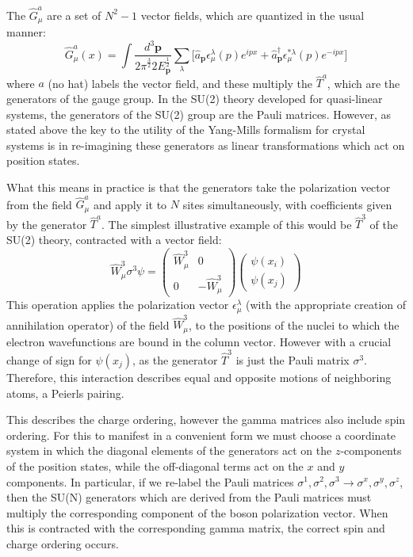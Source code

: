 \documentclass[prb,showpacs,superscriptaddress,titlepage,amsmath,amssymb,twocolumn]{revtex4-1}
\begin{document}
The $\hat{G}^{a}_{\mu}$ are a set of $N^{2}-1$ vector fields, which are quantized in the usual manner:
\begin{equation}
\hat{G}^{a}_{\mu}(x) = \int \frac{d^{3}\mathbf{p}}{{2\pi}^\frac{3}{2}2E_{\mathbf{p}}^{\frac{1}{2}}}\sum_{\lambda}\big[\hat{a}_{\mathbf{p}}\epsilon^{\lambda}_{\mu}(p)e^{ipx} + \hat{a}_{\mathbf{p}}^{\dagger}\epsilon^{*\lambda}_{\mu}(p)e^{-ipx}\big]
\label{A-field}
\end{equation}
where $a$ (no hat) labels the vector field, and these multiply the $\hat{T}^{a}$, which are the generators of the gauge group. In the SU(2) theory developed for quasi-linear systems, the generators of the SU(2) group are the Pauli matrices. However, as stated above the key to the utility of the Yang-Mills formalism for crystal systems is in re-imagining these generators as linear transformations which act on position states.

What this means in practice is that the generators take the polarization vector from the field $\hat{G}^{a}_{\mu}$ and apply it to $N$ sites simultaneously, with coefficients given by the generator $\hat{T}^{a}$. The simplest illustrative example of this would be $\hat{T}^{3}$ of the SU(2) theory, contracted with a vector field:
\begin{equation}
\hat{W}^{3}_{\mu}\sigma^{3}\psi = \begin{pmatrix}\hat{W}^{3}_{\mu}&0\\0&-\hat{W}^{3}_{\mu}\end{pmatrix}\begin{pmatrix}\psi(x_{i})\\\psi(x_{j})\end{pmatrix}
\end{equation}
This operation applies the polarization vector $\epsilon^{\lambda}_{\mu}$ (with the appropriate creation of annihilation operator) of the field $\hat{W}^{3}_{\mu}$, to the positions of the nuclei to which the electron wavefunctions are bound in the column vector. However with a crucial change of sign for $\psi(x_{j})$, as the generator $\hat{T}^{3}$ is just the Pauli matrix $\sigma^{3}$. Therefore, this interaction describes equal and opposite motions of neighboring atoms, a Peierls pairing.

This describes the charge ordering, however the gamma matrices also include spin ordering. For this to manifest in a convenient form we must choose a coordinate system in which the diagonal elements of the generators act on the $z$-components of the position states, while the off-diagonal terms act on the $x$ and $y$ components. In particular, if we re-label the Pauli matrices $\sigma^{1}, \sigma^{2}, \sigma^{3}\rightarrow \sigma^{x}, \sigma^{y}, \sigma^{z}$, then the SU(N) generators which are derived from the Pauli matrices must multiply the corresponding component of the boson polarization vector. When this is contracted with the corresponding gamma matrix, the correct spin and charge ordering occurs. 
\end{document}
